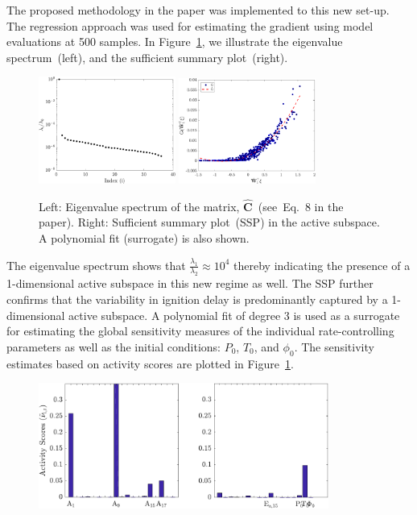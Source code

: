 \documentclass[11pt,final]{article}
\begin{document}
\begin{enumerate}[wide, labelwidth=!, labelindent=0pt]
The proposed methodology in the paper was implemented to this new set-up. The regression approach was used for
estimating the gradient using model evaluations at 500 samples. In Figure~\ref{fig:as}, we illustrate the
eigenvalue spectrum~(left), and the sufficient summary plot~(right).
%
\begin{figure}[htbp]
 \begin{center}
  \includegraphics[width=0.4\textwidth]{./Figures/eig_plot_rev2}
  \includegraphics[width=0.4\textwidth]{./Figures/ssp_rev2}
\caption{Left: Eigenvalue spectrum of the matrix, $\hat{\bm{C}}$~(see~Eq.~8 in the paper). Right: Sufficient summary
plot~(SSP) in the active subspace. A polynomial fit (surrogate) is also shown.} 
\label{fig:as}
\end{center}
\end{figure}
%
The eigenvalue spectrum shows that $\frac{\lambda_1}{\lambda_2}\approx 10^{4}$ thereby indicating the presence of 
a 1-dimensional active subspace in this new regime as well. The SSP further confirms that the variability in ignition delay
is predominantly captured by a 1-dimensional active subspace. A polynomial fit of degree 3 is used as a surrogate for
estimating the global sensitivity measures of the individual rate-controlling parameters as well as the initial conditions:
$P_0$, $T_0$, and $\phi_0$. The sensitivity estimates based on activity scores are plotted in Figure~\ref{fig:as}.
\begin{figure}[htbp]
 \begin{center}
  \includegraphics[width=0.85\textwidth]{./Figures/as_36D_rev2}

\end{center}
\end{figure}
\end{enumerate}
\end{document}
